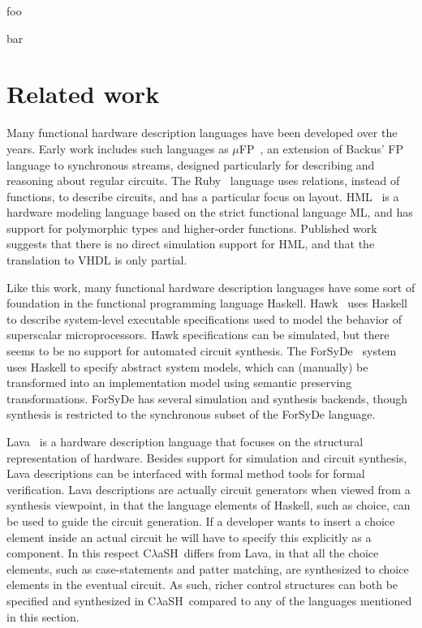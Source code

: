 \documentclass[conference]{IEEEtran}
\def\CLaSH{C$\lambda$aSH}
\begin{document}
foo\par bar

\section{Related work}
Many functional hardware description languages have been developed over the years. Early work includes such languages as $\mu$FP~\cite{muFP}, an extension of Backus' FP language to synchronous streams, designed particularly for describing and reasoning about regular circuits. The Ruby~\cite{Ruby} language uses relations, instead of functions, to describe circuits, and has a particular focus on layout. HML~\cite{HML2} is a hardware modeling language based on the strict functional language ML, and has support for polymorphic types and higher-order functions. Published work suggests that there is no direct simulation support for HML, and that the translation to VHDL is only partial.

Like this work, many functional hardware description languages have some sort of foundation in the functional programming language Haskell. Hawk~\cite{Hawk1} uses Haskell to describe system-level executable specifications used to model the behavior of superscalar microprocessors. Hawk specifications can be simulated, but there seems to be no support for automated circuit synthesis. The ForSyDe~\cite{ForSyDe2} system uses Haskell to specify abstract system models, which can (manually) be transformed into an implementation model using semantic preserving transformations. ForSyDe has several simulation and synthesis backends, though synthesis is restricted to the synchronous subset of the ForSyDe language.

Lava~\cite{Lava} is a hardware description language that focuses on the structural representation of hardware. Besides support for simulation and circuit synthesis, Lava descriptions can be interfaced with formal method tools for formal verification. Lava descriptions are actually circuit generators when viewed from a synthesis viewpoint, in that the language elements of Haskell, such as choice, can be used to guide the circuit generation. If a developer wants to insert a choice element inside an actual circuit he will have to specify this explicitly as a component. In this respect \CLaSH\ differs from Lava, in that all the choice elements, such as case-statements and patter matching, are synthesized to choice elements in the eventual circuit. As such, richer control structures can both be specified and synthesized in \CLaSH\ compared to any of the languages mentioned in this section.
\end{document}
